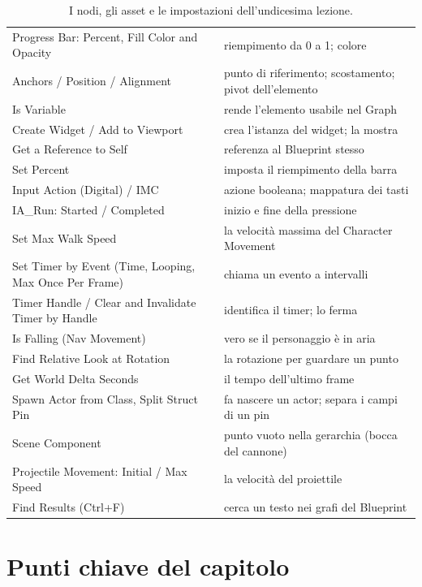 \begin{table}[htbp]
\begin{tabular}{@{}p{4.8cm}p{9.2cm}@{}}
Progress Bar: Percent, Fill Color and Opacity & riempimento da 0 a 1; colore \\
Anchors / Position / Alignment & punto di riferimento; scostamento; pivot dell'elemento \\
Is Variable & rende l'elemento usabile nel Graph \\
Create Widget / Add to Viewport & crea l'istanza del widget; la mostra \\
Get a Reference to Self & referenza al Blueprint stesso \\
Set Percent & imposta il riempimento della barra \\
Input Action (Digital) / IMC & azione booleana; mappatura dei tasti \\
IA\_Run: Started / Completed & inizio e fine della pressione \\
Set Max Walk Speed & la velocità massima del Character Movement \\
Set Timer by Event (Time, Looping, Max Once Per Frame) & chiama un evento a intervalli \\
Timer Handle / Clear and Invalidate Timer by Handle & identifica il timer; lo ferma \\
Is Falling (Nav Movement) & vero se il personaggio è in aria \\
Find Relative Look at Rotation & la rotazione per guardare un punto \\
Get World Delta Seconds & il tempo dell'ultimo frame \\
Spawn Actor from Class, Split Struct Pin & fa nascere un actor; separa i campi di un pin \\
Scene Component & punto vuoto nella gerarchia (bocca del cannone) \\
Projectile Movement: Initial / Max Speed & la velocità del proiettile \\
Find Results (Ctrl+F) & cerca un testo nei grafi del Blueprint \\
\bottomrule
\end{tabular}
\caption{I nodi, gli asset e le impostazioni dell'undicesima lezione.}
\label{ue11:tab:nodi}
\end{table}

\section*{Punti chiave del capitolo}

